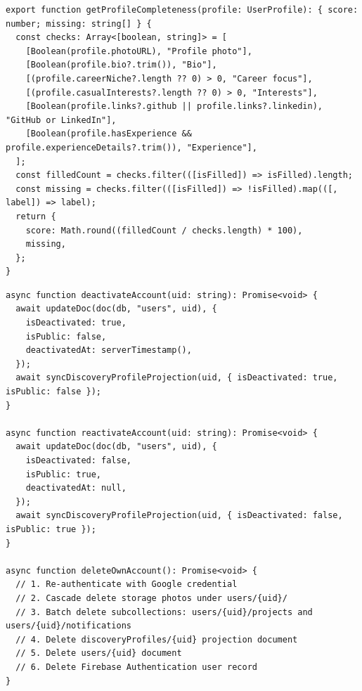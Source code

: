 \documentclass[11pt,letterpaper]{article}
\begin{document}
\begin{lstlisting}[caption={Profile Completeness Algorithm (\texttt{getProfileCompleteness})}]
export function getProfileCompleteness(profile: UserProfile): { score: number; missing: string[] } {
  const checks: Array<[boolean, string]> = [
    [Boolean(profile.photoURL), "Profile photo"],
    [Boolean(profile.bio?.trim()), "Bio"],
    [(profile.careerNiche?.length ?? 0) > 0, "Career focus"],
    [(profile.casualInterests?.length ?? 0) > 0, "Interests"],
    [Boolean(profile.links?.github || profile.links?.linkedin), "GitHub or LinkedIn"],
    [Boolean(profile.hasExperience && profile.experienceDetails?.trim()), "Experience"],
  ];
  const filledCount = checks.filter(([isFilled]) => isFilled).length;
  const missing = checks.filter(([isFilled]) => !isFilled).map(([, label]) => label);
  return {
    score: Math.round((filledCount / checks.length) * 100),
    missing,
  };
}
\end{lstlisting}

\begin{lstlisting}[caption={Account Lifecycle Algorithms}]
async function deactivateAccount(uid: string): Promise<void> {
  await updateDoc(doc(db, "users", uid), {
    isDeactivated: true,
    isPublic: false,
    deactivatedAt: serverTimestamp(),
  });
  await syncDiscoveryProfileProjection(uid, { isDeactivated: true, isPublic: false });
}

async function reactivateAccount(uid: string): Promise<void> {
  await updateDoc(doc(db, "users", uid), {
    isDeactivated: false,
    isPublic: true,
    deactivatedAt: null,
  });
  await syncDiscoveryProfileProjection(uid, { isDeactivated: false, isPublic: true });
}

async function deleteOwnAccount(): Promise<void> {
  // 1. Re-authenticate with Google credential
  // 2. Cascade delete storage photos under users/{uid}/
  // 3. Batch delete subcollections: users/{uid}/projects and users/{uid}/notifications
  // 4. Delete discoveryProfiles/{uid} projection document
  // 5. Delete users/{uid} document
  // 6. Delete Firebase Authentication user record
}
\end{lstlisting}
\end{document}
